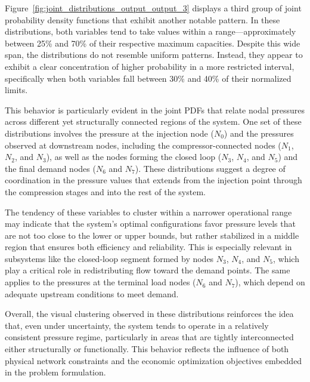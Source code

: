 Figure~\ref{fig:joint_distributions_output_output_3} displays a third group of joint probability density functions that exhibit another notable pattern. In these distributions, both variables tend to take values within a range—approximately between 25\% and 70\% of their respective maximum capacities. Despite this wide span, the distributions do not resemble uniform patterns. Instead, they appear to exhibit a clear concentration of higher probability in a more restricted interval, specifically when both variables fall between 30\% and 40\% of their normalized limits.

This behavior is particularly evident in the joint PDFs that relate nodal pressures across different yet structurally connected regions of the system. One set of these distributions involves the pressure at the injection node ($N_0$) and the pressures observed at downstream nodes, including the compressor-connected nodes ($N_1$, $N_2$, and $N_3$), as well as the nodes forming the closed loop ($N_3$, $N_4$, and $N_5$) and the final demand nodes ($N_6$ and $N_7$). These distributions suggest a degree of coordination in the pressure values that extends from the injection point through the compression stages and into the rest of the system.

The tendency of these variables to cluster within a narrower operational range may indicate that the system's optimal configurations favor pressure levels that are not too close to the lower or upper bounds, but rather stabilized in a middle region that ensures both efficiency and reliability. This is especially relevant in subsystems like the closed-loop segment formed by nodes $N_3$, $N_4$, and $N_5$, which play a critical role in redistributing flow toward the demand points. The same applies to the pressures at the terminal load nodes ($N_6$ and $N_7$), which depend on adequate upstream conditions to meet demand.

Overall, the visual clustering observed in these distributions reinforces the idea that, even under uncertainty, the system tends to operate in a relatively consistent pressure regime, particularly in areas that are tightly interconnected either structurally or functionally. This behavior reflects the influence of both physical network constraints and the economic optimization objectives embedded in the problem formulation.



